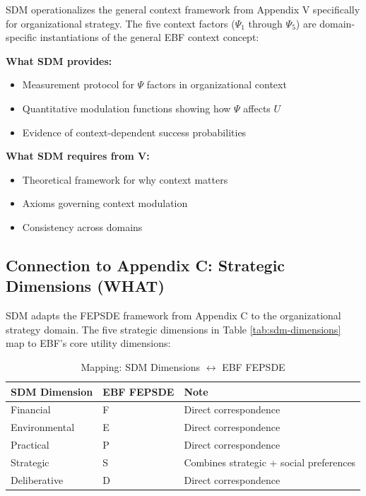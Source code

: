 SDM operationalizes the general context framework from Appendix V specifically for organizational strategy. The five context factors ($\Psi_1$ through $\Psi_5$) are domain-specific instantiations of the general EBF context concept:

\begin{tcolorbox}[colback=yellow!5!white, colframe=yellow!75!black,
    title=Integration: SDM $\leftrightarrow$ Appendix V (WHEN)]

\textbf{What SDM provides:}
\begin{itemize}[nosep]
\item Measurement protocol for $\Psi$ factors in organizational context
\item Quantitative modulation functions showing how $\Psi$ affects $U$
\item Evidence of context-dependent success probabilities
\end{itemize}

\textbf{What SDM requires from V:}
\begin{itemize}[nosep]
\item Theoretical framework for why context matters
\item Axioms governing context modulation
\item Consistency across domains
\end{itemize}

\end{tcolorbox}

\subsection{Connection to Appendix C: Strategic Dimensions (WHAT)}

SDM adapts the FEPSDE framework from Appendix C to the organizational strategy domain. The five strategic dimensions in Table \ref{tab:sdm-dimensions} map to EBF's core utility dimensions:

\begin{table}[htbp]
\centering
\caption{Mapping: SDM Dimensions $\leftrightarrow$ EBF FEPSDE}
\label{tab:sdm-fepsde-mapping}
\renewcommand{\arraystretch}{1.3}
\begin{tabular}{@{}lll@{}}
\toprule
\textbf{SDM Dimension} & \textbf{EBF FEPSDE} & \textbf{Note} \\
\midrule
Financial & F & Direct correspondence \\
Environmental & E & Direct correspondence \\
Practical & P & Direct correspondence \\
Strategic & S & Combines strategic + social preferences \\
Deliberative & D & Direct correspondence \\
\bottomrule
\end{tabular}
\end{table}

